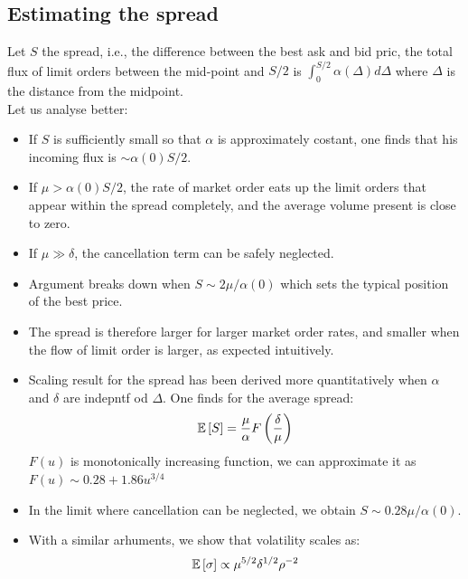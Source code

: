 \subsection{Estimating the spread}
Let $S$ the spread, i.e., the difference between the best ask and bid pric, the total flux of limit orders between the mid-point and $S/2$ is $\int_0^{S/2} \alpha(\Delta) d\Delta$ where $\Delta$ is the distance from the midpoint.\\
Let us analyse better:
\begin{itemize}
	\item If $S$ is sufficiently small so that $\alpha$ is approximately costant, one finds that his incoming flux is $\sim \alpha(0)S/2$.
	\item If $\mu > \alpha(0)S/2$, the rate of market order eats up the limit orders that appear within the spread completely, and the average volume present is close to zero.
	\item If $\mu \gg \delta$, the cancellation term can be safely neglected.
	\item Argument breaks down when $S\sim 2 \mu/\alpha(0)$ which sets the typical position of the best price.
	\item The spread is therefore larger for larger market order rates, and smaller when the flow of limit order is larger, as expected intuitively.
	\item Scaling result for the spread has been derived more quantitatively when $\alpha$ and $\delta$ are indepntf od $\Delta$. One finds for the average spread:
	\[
	\mathbb{E}\left[S\right] = \frac{\mu}{\alpha}F\left(\frac{\delta}{\mu}\right)
	\]
	$F(u)$ is monotonically increasing function, we can approximate it as $F(u) \sim 0.28 + 1.86u^{3/4}$
	\item In the limit where cancellation can be neglected, we obtain $S\sim 0.28 \mu / \alpha(0)$.
	\item With a similar arhuments, we show that volatility scales as:
	\[
	\mathbb{E}\left[\sigma\right] \propto \mu^{5/2}\delta^{1/2}\rho^{-2}
	\]
\end{itemize}
